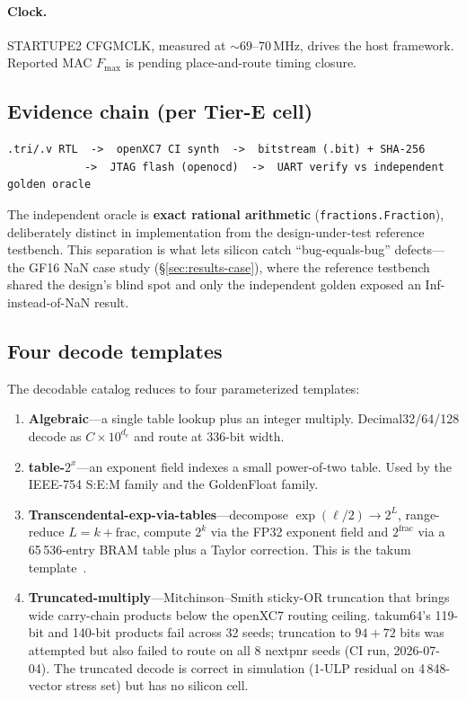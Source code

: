 \documentclass[11pt]{article}
\begin{document}
\paragraph{Clock.} STARTUPE2 CFGMCLK, measured at ${\sim}69$--70\,MHz, drives
the host framework. Reported MAC $F_{\max}$ is pending place-and-route timing
closure.

\subsection{Evidence chain (per Tier-E cell)}

\begin{verbatim}
.tri/.v RTL  ->  openXC7 CI synth  ->  bitstream (.bit) + SHA-256
            ->  JTAG flash (openocd)  ->  UART verify vs independent golden oracle
\end{verbatim}

The independent oracle is \textbf{exact rational arithmetic}
(\texttt{fractions.Fraction}), deliberately distinct in implementation from the
design-under-test reference testbench. This separation is what lets silicon
catch ``bug-equals-bug'' defects---the GF16 NaN case study (\S\ref{sec:results-case}),
where the reference testbench shared the design's blind spot and only the
independent golden exposed an Inf-instead-of-NaN result.

\subsection{Four decode templates}

The decodable catalog reduces to four parameterized templates:

\begin{enumerate}[label=\arabic*.,leftmargin=*]
\item \textbf{Algebraic}---a single table lookup plus an integer multiply.
  Decimal32/64/128 decode as $C \times 10^{d_{e}}$ and route at 336-bit width.

\item \textbf{table-$2^{x}$}---an exponent field indexes a small power-of-two
  table. Used by the IEEE-754 S:E:M family and the GoldenFloat family.

\item \textbf{Transcendental-exp-via-tables}---decompose
  $\exp(\ell/2) \to 2^{L}$, range-reduce $L = k + \text{frac}$, compute $2^{k}$
  via the FP32 exponent field and $2^{\text{frac}}$ via a 65\,536-entry BRAM
  table plus a Taylor correction. This is the takum
  template~\cite{hunhold2024takum}.

\item \textbf{Truncated-multiply}---Mitchinson--Smith sticky-OR truncation that
  brings wide carry-chain products below the openXC7 routing ceiling. takum64's
  119-bit and 140-bit products fail across 32 seeds; truncation to $94 + 72$
  bits was attempted but also failed to route on all 8 nextpnr seeds
  (CI run, 2026-07-04). The truncated decode is correct in simulation
  (1-ULP residual on 4\,848-vector stress set) but has no silicon cell.
\end{enumerate}
\end{document}
